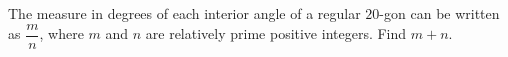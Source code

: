 The measure in degrees of each interior angle of a regular $20$-gon can be written as $\dfrac{m}{n}$, where $m$ and $n$ are relatively prime positive integers. Find $m+n$.
